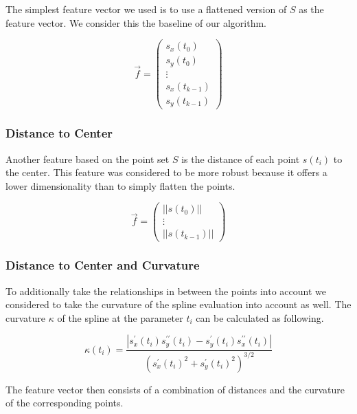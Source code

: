 \documentclass[pdftex,12pt,a4paper]{report}
\begin{document}
The simplest feature vector we used is to use a flattened version of $S$ as the feature
vector. We consider this the baseline of our algorithm.

\begin{equation}
\vec{f} = \left( \begin{array}{c}
s_x(t_0) \\
s_y(t_0) \\
\vdots \\
s_x(t_{k-1}) \\
s_y(t_{k-1})
\end{array} \right)
\end{equation}

\subsubsection{Distance to Center}

Another feature based on the point set $S$ is the distance of each point $s(t_i)$ to the
center. This feature was considered	to be more robust because it offers a lower dimensionality
than to simply flatten the points.

\begin{equation}
\vec{f} = \left( \begin{array}{c}
||s(t_0)|| \\
\vdots \\
||s(t_{k-1})||
\end{array} \right)
\end{equation}

\subsubsection{Distance to Center and Curvature}
\label{subsub:featuredistancetocenterandcurvature}

To additionally take the relationships in between the points into account we considered
to take the curvature of the spline evaluation into account as well. The curvature $\kappa$ of the spline at the parameter $t_i$ can be calculated as following.

\begin{equation}
\kappa(t_i) = \frac{|s_x^\prime(t_i) s_y^{\prime\prime}(t_i) - s_y^\prime(t_i) s_x^{\prime\prime}(t_i)|}{(s_x^\prime(t_i)^2 + s_y^{\prime}(t_i)^2)^{3/2}}
\end{equation}

The feature vector then consists of a combination of distances and the curvature of the
corresponding points.
\end{document}
